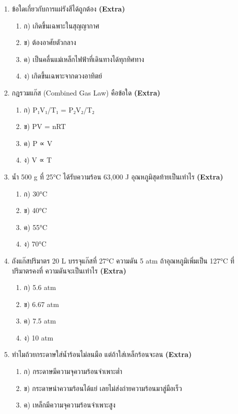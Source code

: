 \documentclass[12pt]{article}
\begin{document}
\begin{enumerate}[label=\arabic*.]
\begin{enumerate}[label=)]
\item ง) 44.8 L
\end{enumerate}
\item ข้อใดเกี่ยวกับการแผ่รังสีได้ถูกต้อง \hfill \textbf{\small (Extra)}
\begin{enumerate}[label=)]
\item ก) เกิดขึ้นเฉพาะในสุญญากาศ
\item ข) ต้องอาศัยตัวกลาง
\item ค) เป็นคลื่นแม่เหล็กไฟฟ้าที่เดินทางได้ทุกทิศทาง
\item ง) เกิดขึ้นเฉพาะจากดวงอาทิตย์
\end{enumerate}
\item กฎรวมแก๊ส (Combined Gas Law) คือข้อใด \hfill \textbf{\small (Extra)}
\begin{enumerate}[label=)]
\item ก) P₁V₁/T₁ = P₂V₂/T₂
\item ข) PV = nRT
\item ค) P ∝ V
\item ง) V ∝ T
\end{enumerate}
\item น้ำ 500 g ที่ 25°C ได้รับความร้อน 63,000 J อุณหภูมิสุดท้ายเป็นเท่าไร \hfill \textbf{\small (Extra)}
\begin{enumerate}[label=)]
\item ก) 30°C
\item ข) 40°C
\item ค) 55°C
\item ง) 70°C
\end{enumerate}
\item ถังแก๊สปริมาตร 20 L บรรจุแก๊สที่ 27°C ความดัน 5 atm ถ้าอุณหภูมิเพิ่มเป็น 127°C ที่ปริมาตรคงที่ ความดันจะเป็นเท่าไร \hfill \textbf{\small (Extra)}
\begin{enumerate}[label=)]
\item ก) 5.6 atm
\item ข) 6.67 atm
\item ค) 7.5 atm
\item ง) 10 atm
\end{enumerate}
\item ทำไมถ้วยกระดาษใส่น้ำร้อนไม่ลนมือ แต่ถ้าใส่เหล็กร้อนจะลน \hfill \textbf{\small (Extra)}
\begin{enumerate}[label=)]
\item ก) กระดาษมีความจุความร้อนจำเพาะต่ำ
\item ข) กระดาษนำความร้อนได้แย่ เลยไม่ส่งถ่ายความร้อนมาสู่มือเร็ว
\item ค) เหล็กมีความจุความร้อนจำเพาะสูง

\end{enumerate}
\end{enumerate}
\end{document}
